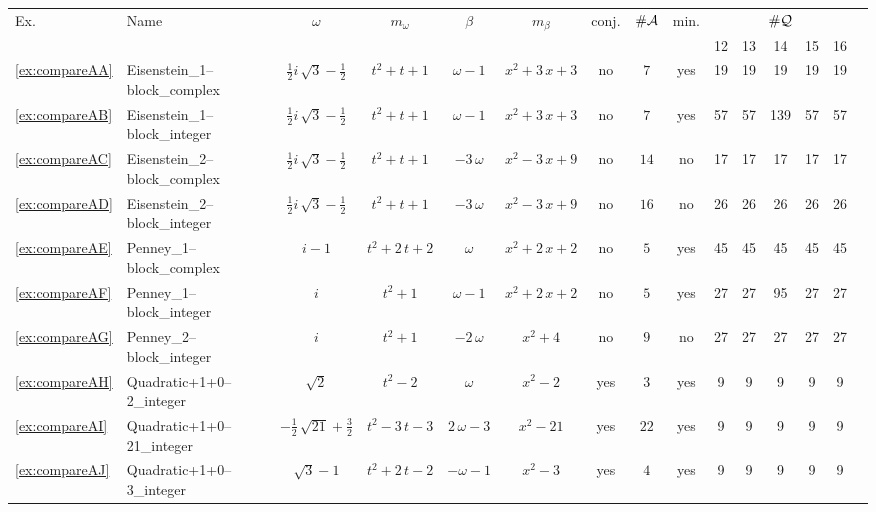 \begin{tabular}{ll|c c c c|ccc|c c  c  c  c  c  }
\multirow{2}{*}{Ex.} &\multirow{2}{*}{Name} & \multirow{2}{*}{$\omega$} & \multirow{2}{*}{$m_\omega$} & \multirow{2}{*}{$\beta$} & \multirow{2}{*}{$m_\beta$} & \multirow{2}{*}{conj.} & \multirow{2}{*}{$\#\mathcal{A}$} & \multirow{2}{*}{min.} & \multicolumn{5}{c}{$\#\mathcal{Q}$} \\
 &  &  &  &  &  &  &  &  & 12 & 13 & 14 & 15 & 16 \\ \hline
\ref{ex:compareAA} & Eisenstein\_1--block\_complex & $ \frac{1}{2} i \, \sqrt{3} - \frac{1}{2} $ & $ t^{2} + t + 1 $ & $ \omega - 1 $ & $ x^{2} + 3 \, x + 3 $ & no & $ 7 $ & yes & 19 & 19 & 19 & 19 & 19 \\
\ref{ex:compareAB} & Eisenstein\_1--block\_integer & $ \frac{1}{2} i \, \sqrt{3} - \frac{1}{2} $ & $ t^{2} + t + 1 $ & $ \omega - 1 $ & $ x^{2} + 3 \, x + 3 $ & no & $ 7 $ & yes & 57 & 57 & 139 & 57 & 57 \\
\ref{ex:compareAC} & Eisenstein\_2--block\_complex & $ \frac{1}{2} i \, \sqrt{3} - \frac{1}{2} $ & $ t^{2} + t + 1 $ & $ -3 \, \omega $ & $ x^{2} - 3 \, x + 9 $ & no & $ 14 $ & no & 17 & 17 & 17 & 17 & 17 \\
\ref{ex:compareAD} & Eisenstein\_2--block\_integer & $ \frac{1}{2} i \, \sqrt{3} - \frac{1}{2} $ & $ t^{2} + t + 1 $ & $ -3 \, \omega $ & $ x^{2} - 3 \, x + 9 $ & no & $ 16 $ & no & 26 & 26 & 26 & 26 & 26 \\
\ref{ex:compareAE} & Penney\_1--block\_complex & $ i - 1 $ & $ t^{2} + 2 \, t + 2 $ & $ \omega $ & $ x^{2} + 2 \, x + 2 $ & no & $ 5 $ & yes & 45 & 45 & 45 & 45 & 45 \\
\ref{ex:compareAF} & Penney\_1--block\_integer & $ i $ & $ t^{2} + 1 $ & $ \omega - 1 $ & $ x^{2} + 2 \, x + 2 $ & no & $ 5 $ & yes & 27 & 27 & 95 & 27 & 27 \\
\ref{ex:compareAG} & Penney\_2--block\_integer & $ i $ & $ t^{2} + 1 $ & $ -2 \, \omega $ & $ x^{2} + 4 $ & no & $ 9 $ & no & 27 & 27 & 27 & 27 & 27 \\
\ref{ex:compareAH} & Quadratic+1+0--2\_integer & $ \sqrt{2} $ & $ t^{2} - 2 $ & $ \omega $ & $ x^{2} - 2 $ & yes & $ 3 $ & yes & 9 & 9 & 9 & 9 & 9 \\
\ref{ex:compareAI} & Quadratic+1+0--21\_integer & $ -\frac{1}{2} \, \sqrt{21} + \frac{3}{2} $ & $ t^{2} - 3 \, t - 3 $ & $ 2 \, \omega - 3 $ & $ x^{2} - 21 $ & yes & $ 22 $ & yes & 9 & 9 & 9 & 9 & 9 \\
\ref{ex:compareAJ} & Quadratic+1+0--3\_integer & $ \sqrt{3} - 1 $ & $ t^{2} + 2 \, t - 2 $ & $ -\omega - 1 $ & $ x^{2} - 3 $ & yes & $ 4 $ & yes & 9 & 9 & 9 & 9 & 9 \\

\end{tabular}
